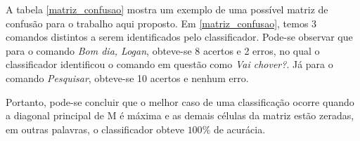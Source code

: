 \documentclass[a4paper,12pt,twoside,openright]{report}
\begin{document}
\par A tabela \ref{matriz_confusao} mostra um exemplo de uma poss\'{i}vel matriz de confus\~{a}o para o trabalho aqui proposto. Em \ref{matriz_confusao}, temos 3 comandos distintos a serem identificados pelo classificador. Pode-se observar que para o comando \textit{Bom dia, Logan}, obteve-se 8 acertos e 2 erros, no qual o classificador identificou o comando em quest\~{a}o como \textit{Vai chover?}. J\'{a} para o comando \textit{Pesquisar}, obteve-se 10 acertos e nenhum erro.

\par Portanto, pode-se concluir que o melhor caso de uma classifica{\c c}\~{a}o ocorre quando a diagonal principal de M \'{e} m\'{a}xima e as demais c\'{e}lulas da matriz est\~{a}o zeradas, em outras palavras, o classificador obteve $100\%$ de acur\'{a}cia.


\end{document}
